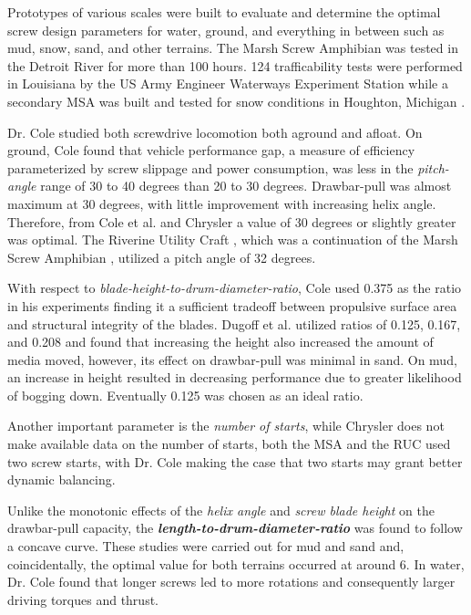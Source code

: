 

Prototypes of various scales were built to evaluate and determine the optimal screw design parameters for water, ground, and  everything in between such as mud, snow, sand, and other terrains. The Marsh Screw Amphibian was tested in the Detroit River for more than 100 hours. 124 trafficability tests were performed in Louisiana by the US Army Engineer Waterways Experiment Station while a secondary MSA was built and tested for snow conditions in Houghton, Michigan \cite{Gorton1965}. 

Dr. Cole studied both screwdrive locomotion both aground and afloat. On ground, Cole \cite{Cole1961} found that vehicle performance gap, a measure of efficiency parameterized by screw slippage and power consumption, was less in the \emph{pitch-angle} range of 30 to 40 degrees than 20 to 30 degrees.  Drawbar-pull was almost maximum at 30 degrees, with little improvement with increasing helix angle. Therefore, from Cole et al. \cite{Cole1961} and Chrysler \cite{Dugoff1967, Fales1972} a value of 30 degrees or slightly greater was optimal. The Riverine Utility Craft \cite{Fales1972}, which was a continuation of the Marsh Screw Amphibian \cite{Dugoff1967}, utilized a pitch angle of 32 degrees.

With respect to \emph{blade-height-to-drum-diameter-ratio}, Cole used 0.375 as the ratio in his experiments finding it a sufficient tradeoff between propulsive surface area and structural integrity of the blades. Dugoff et al. \cite{Dugoff1967} utilized ratios of 0.125, 0.167, and 0.208 and found that increasing the height also increased the amount of media moved, however, its effect on drawbar-pull was minimal in sand. On mud, an increase in height resulted in decreasing performance due to greater likelihood of bogging down. Eventually 0.125 was chosen as an ideal ratio.

Another important parameter is the \emph{number of starts}, while Chrysler does not make available data on the number of starts, both the MSA and the RUC \cite{Knight1965} used two screw starts, with Dr. Cole making the case that two starts may grant better dynamic balancing. 

Unlike the monotonic effects of the \emph{helix angle} and \emph{screw blade height} on the drawbar-pull capacity, the \textbf{\emph{length-to-drum-diameter-ratio}} was found to follow a concave curve. These studies were carried out for mud and sand and, coincidentally, the optimal value for both terrains occurred at around 6. In water, Dr. Cole found that longer screws led to more rotations and consequently larger driving torques and thrust.  


